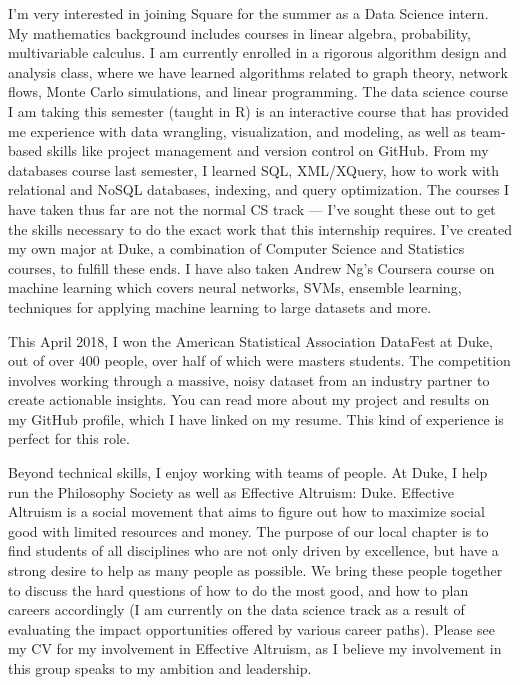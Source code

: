 \documentclass[11pt, a4paper]{awesome-cv} %
\begin{document}
\makecvheader %

\makelettertitle %


\begin{cvletter}



I’m very interested in joining Square for the summer as a Data Science intern. My mathematics background includes courses in linear algebra, probability, multivariable calculus. I am currently enrolled in a rigorous algorithm design and analysis class, where we have learned algorithms related to graph theory, network flows, Monte Carlo simulations, and linear programming. The data science course I am taking this semester (taught in R) is an interactive course that has provided me experience with data wrangling, visualization, and modeling, as well as team-based skills like project management and version control on GitHub. From my databases course last semester, I learned SQL, XML/XQuery, how to work with relational and NoSQL databases, indexing, and query optimization. The courses I have taken thus far are not the normal CS track — I’ve sought these out to get the skills necessary to do the exact work that this internship requires. I’ve created my own major at Duke, a combination of Computer Science and Statistics courses, to fulfill these ends. I have also taken Andrew Ng’s Coursera course on machine learning which covers neural networks, SVMs, ensemble learning, techniques for applying machine learning to large datasets and more. 

This April 2018, I won the American Statistical Association DataFest at Duke, out of over 400 people, over half of which were masters students. The competition involves working through a massive, noisy dataset from an industry partner to create actionable insights. You can read more about my project and results on my GitHub profile, which I have linked on my resume. This kind of experience is perfect for this role.

Beyond technical skills, I enjoy working with teams of people. At Duke, I help run the Philosophy Society as well as Effective Altruism: Duke. Effective Altruism is a social movement that aims to figure out how to maximize social good with limited resources and money. The purpose of our local chapter is to find students of all disciplines who are not only driven by excellence, but have a strong desire to help as many people as possible. We bring these people together to discuss the hard questions of how to do the most good, and how to plan careers accordingly (I am currently on the data science track as a result of evaluating the impact opportunities offered by various career paths). Please see my CV for my involvement in Effective Altruism, as I believe my involvement in this group speaks to my ambition and leadership.
	


\end{cvletter}
\end{document}
